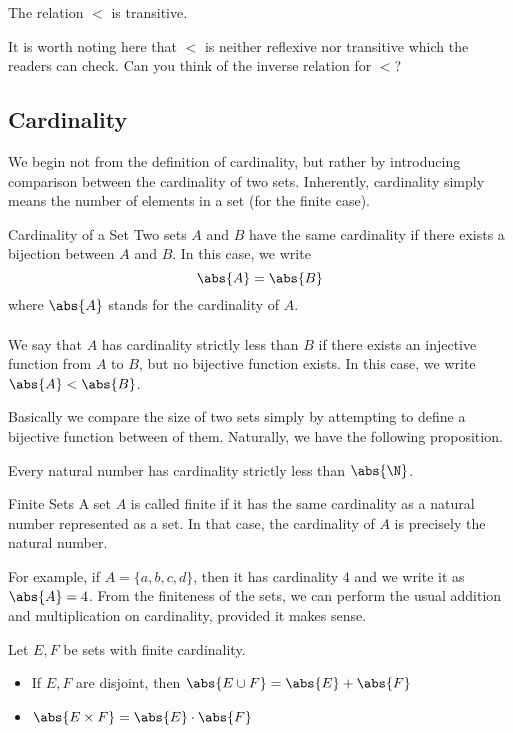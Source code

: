 \begin{prp}{}{} The relation $<$ is transitive. 
\end{prp}

It is worth noting here that $<$ is neither reflexive nor transitive which the readers can check. Can you think of the inverse relation for $<$?

\subsection{Cardinality}
We begin not from the definition of cardinality, but rather by introducing comparison between the cardinality of two sets. Inherently, cardinality simply means the number of elements in a set (for the finite case). 

\begin{defn}{Cardinality of a Set}{} Two sets $A$ and $B$ have the same cardinality if there exists a bijection between $A$ and $B$. In this case, we write $$\abs{A}=\abs{B}$$ where $\abs{A}$ stands for the cardinality of $A$. \\~\\
We say that $A$ has cardinality strictly less than $B$ if there exists an injective function from $A$ to $B$, but no bijective function exists. In this case, we write $\abs{A}<\abs{B}$. 
\end{defn}

Basically we compare the size of two sets simply by attempting to define a bijective function between of them. Naturally, we have the following proposition. 

\begin{prp}{}{} Every natural number has cardinality strictly less than $\abs{\N}$. 
\end{prp}

\begin{defn}{Finite Sets}{} A set $A$ is called finite if it has the same cardinality as a natural number represented as a set. In that case, the cardinality of $A$ is precisely the natural number. 
\end{defn}

For example, if $A=\{a,b,c,d\}$, then it has cardinality $4$ and we write it as $\abs{A}=4$. From the finiteness of the sets, we can perform the usual addition and multiplication on cardinality, provided it makes sense. 

\begin{prp}{}{} Let $E,F$ be sets with finite cardinality. 
\begin{itemize}
\item If $E,F$ are disjoint, then $\abs{E\cup F}=\abs{E}+\abs{F}$
\item $\abs{E\times F}=\abs{E}\cdot\abs{F}$
\end{itemize}
\end{prp}

